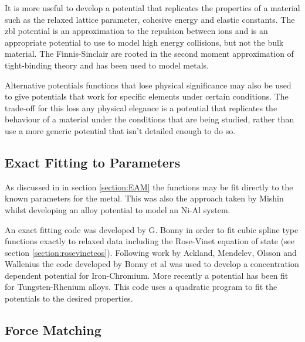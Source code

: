 It is more useful to develop a potential that replicates the properties of a material such as the relaxed lattice parameter, cohesive energy and elastic constants.  The \acrshort{zbl} potential is an approximation to the repulsion between ions and is an appropriate potential to use to model high energy collisions, but not the bulk material.  The Finnis-Sinclair are rooted in the second moment approximation of tight-binding theory and has been used to model metals.

Alternative potentials functions that lose physical significance may also be used to give potentials that work for specific elements under certain conditions.  The trade-off for this loss any physical elegance \cite{twobandackland} is a potential that replicates the behaviour of a material under the conditions that are being studied, rather than use a more generic potential that isn't detailed enough to do so.



\subsection{Exact Fitting to Parameters}

As discussed in in section \ref{section:EAM} the functions may be fit directly to the known parameters for the metal.  This was also the approach taken by Mishin whilst developing an alloy potential to model an Ni-Al system\cite{mishinnial}.

An exact fitting code was developed by G. Bonny in order to fit cubic spline type functions exactly to relaxed data including the Rose-Vinet equation of state (see section \ref{section:rosevineteos}).  Following work by Ackland\cite{twobandackland}, Mendelev\cite{femendelev}, Olsson and Wallenius\cite{olssonfecr} the code developed by Bonny et al was used to develop a concentration dependent potential for Iron-Chromium\cite{ipbonny}.  More recently a potential has been fit for Tungsten-Rhenium alloys\cite{bonnywre}.  This code uses a quadratic program\cite{nocedalwright1} to fit the potentials to the desired properties.







\subsection{Force Matching}


